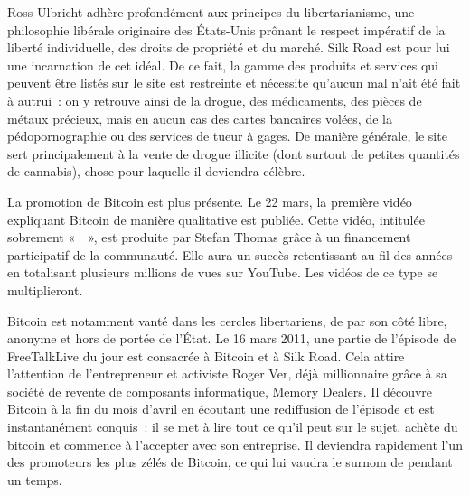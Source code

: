 Ross Ulbricht adhère profondément aux principes du libertarianisme, une philosophie libérale originaire des États-Unis prônant le respect impératif de la liberté individuelle, des droits de propriété et du marché. Silk Road est pour lui une incarnation de cet idéal. De ce fait, la gamme des produits et services qui peuvent être listés sur le site est restreinte et nécessite qu'aucun mal n'ait été fait à autrui~: on y retrouve ainsi de la drogue, des médicaments, des pièces de métaux précieux, mais en aucun cas des cartes bancaires volées, de la pédopornographie ou des services de tueur à gages. De manière générale, le site sert principalement à la vente de drogue illicite (dont surtout de petites quantités de cannabis), chose pour laquelle il deviendra célèbre. %


La promotion de Bitcoin est plus présente. Le 22 mars, la première vidéo expliquant Bitcoin de manière qualitative est publiée. Cette vidéo, intitulée sobrement «~~», est produite par Stefan Thomas grâce à un financement participatif de la communauté. Elle aura un succès retentissant au fil des années en totalisant plusieurs millions de vues sur YouTube. Les vidéos de ce type se multiplieront.

Bitcoin est notamment vanté dans les cercles libertariens, de par son côté libre, anonyme et hors de portée de l'État. Le 16 mars 2011, une partie de l'épisode de FreeTalkLive du jour est consacrée à Bitcoin et à Silk Road. Cela attire l'attention de l'entrepreneur et activiste Roger Ver, déjà millionnaire grâce à sa société de revente de composants informatique, Memory Dealers. Il découvre Bitcoin à la fin du mois d'avril en écoutant une rediffusion de l'épisode et est instantanément conquis~: il se met à lire tout ce qu'il peut sur le sujet, achète du bitcoin et commence à l'accepter avec son entreprise. Il deviendra rapidement l'un des promoteurs les plus zélés de Bitcoin, ce qui lui vaudra le surnom de  pendant un temps.


